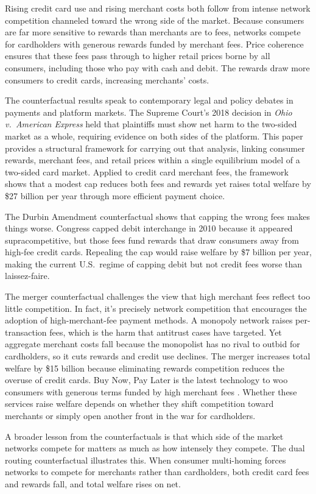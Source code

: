 \documentclass[main.tex]{subfiles}
\begin{document}
Rising credit card use and rising merchant costs both follow from intense network competition channeled toward the wrong side of the market.
Because consumers are far more sensitive to rewards than merchants are to fees, networks compete for cardholders with generous rewards funded by merchant fees.
Price coherence ensures that these fees pass through to higher retail prices borne by all consumers, including those who pay with cash and debit. 
The rewards draw more consumers to credit cards, increasing merchants' costs.

The counterfactual results speak to contemporary legal and policy debates in payments and platform markets.
The Supreme Court's 2018 decision in \emph{Ohio v.\ American Express} held that plaintiffs must show net harm to the two-sided market as a whole, requiring evidence on both sides of the platform.
This paper provides a structural framework for carrying out that analysis, linking consumer rewards, merchant fees, and retail prices within a single equilibrium model of a two-sided card market.
Applied to credit card merchant fees, the framework shows that a modest cap reduces both fees and rewards yet raises total welfare by \$27 billion per year through more efficient payment choice.

The Durbin Amendment counterfactual shows that capping the wrong fees makes things worse.
Congress capped debit interchange in 2010 because it appeared supracompetitive, but those fees fund rewards that draw consumers away from high-fee credit cards.
Repealing the cap would raise welfare by \$7 billion per year,
making the current U.S.\ regime of capping debit but not credit fees worse than laissez-faire.

The merger counterfactual challenges the view that high merchant fees reflect too little competition.
In fact, it's precisely network competition that encourages the adoption of high-merchant-fee payment methods.
A monopoly network raises per-transaction fees, which is the harm that antitrust cases have targeted.
Yet aggregate merchant costs fall because the monopolist has no rival to outbid for cardholders, so it cuts rewards and credit use declines.
The merger increases total welfare by \$15 billion
because eliminating rewards competition reduces the overuse of credit cards.
Buy Now, Pay Later is the latest technology to woo consumers with generous terms funded by high merchant fees \parencite{Berg.etal2024}.
Whether these services raise welfare depends on whether they shift competition toward merchants or simply open another front in the war for cardholders.

A broader lesson from the counterfactuals is that which side of the market networks compete for matters as much as how intensely they compete.
The dual routing counterfactual illustrates this. 
When consumer multi-homing forces networks to compete for merchants rather than cardholders, both credit card fees and rewards fall, and total welfare rises on net.
\end{document}
